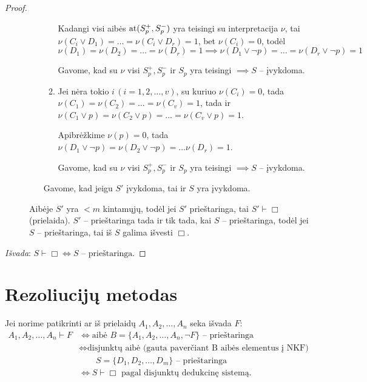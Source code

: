 \begin{prop}
\begin{proof}
\begin{description}
\begin{enumerate}
\begin{enumerate}
                Kadangi visi aibės $\operatorname{at}(S_{p}^{+}, S_{p}^{-})$ yra 
                teisingi su interpretacija $\nu$, tai 
                $\nu(C_i \lor D_1) = \dots = \nu(C_i \lor D_r) = 1$, bet
                $\nu(C_i) = 0$, todėl 
                $\nu(D_1) = \nu(D_2) = \dots = \nu(D_r) = 1 \implies %
                \nu(D_1 \lor \neg p) = \dots = \nu(D_r \lor \neg p) = 1$

                Gavome, kad su $\nu$ visi $S_{p}^{+}, S_{p}^{-}$ ir 
                $S_{p}$ yra teisingi $\implies S$ – įvykdoma.

              \item Jei nėra tokio $i \, (i=1,2,\dotsc,v)$, su kuriuo
                $\nu(C_{i}) = 0$, tada 
                $\nu(C_1) = \nu(C_2) = \dots = \nu(C_v) = 1$, tada ir
                $\nu(C_1 \lor p) = \nu(C_2 \lor p) = \dots =%
                  \nu(C_v \lor p) = 1$.

                Apibrėžkime $\nu(p) = 0$, tada 
                $\nu(D_{1} \lor \neg p) = \nu(D_{2} \lor \neg p) = \dots%
                \nu(D_{r}) = 1$.

                Gavome, kad su $\nu$ visi $S_{p}^{+}, S_{p}^{-}$ ir 
                $S_{p}$ yra teisingi $\implies S$ – įvykdoma.

            \end{enumerate}
            Gavome, kad jeigu $S'$ įvykdoma, tai ir $S$ yra įvykdoma.

        \end{enumerate} 
        Aibėje $S'$ yra $< m$ kintamųjų, todėl jei $S'$ prieštaringa,
        tai $S' \vdash \Box$ (prielaida). $S'$ – prieštaringa 
        tada ir tik tada, kai $S$ – prieštaringa, todėl jei 
        $S$ – prieštaringa, tai iš $S$ galima išvesti $\Box$.
    \end{description}

    \emph{Išvada}: $S \vdash \Box \iff S \text{ – prieštaringa}$.

  \end{proof}

\end{prop}

\section{Rezoliucijų metodas}

Jei norime patikrinti ar iš prielaidų $A_1,A_2,\dotsc,A_n$ seka išvada $F$:
\begin{align*}
  A_1,A_2,\dotsc,A_n \vdash F%
  &\iff \text {aibė } B = \{A_1,A_2,\dotsc,A_n,\neg F\}%
    \text{ – prieštaringa} \\
  &\iff \text{disjunktų aibė (gauta paverčiant B aibės elementus į NKF)}\\
  & \qquad  S = \{D_1,D_2,\dotsc,D_m\} \text{ – prieštaringa} \\
  &\iff S \vdash \Box \text{ pagal disjunktų dedukcinę sistemą}.
\end{align*}
